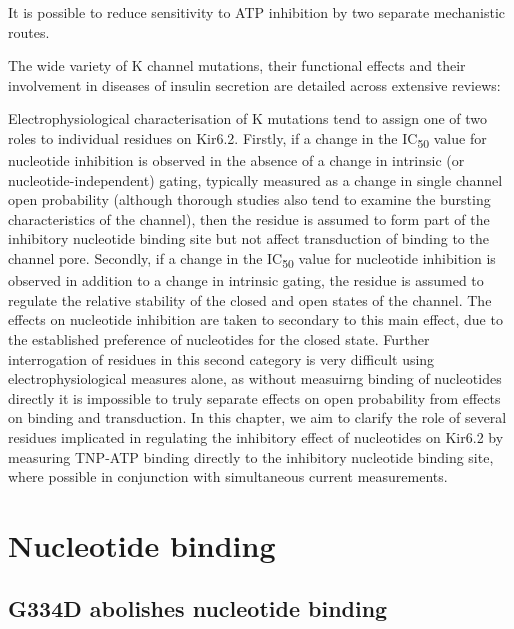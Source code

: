 It is possible to reduce sensitivity to ATP inhibition by two separate mechanistic routes.

The wide variety of K\ATP{} channel mutations, their functional effects and their involvement in diseases of insulin secretion are detailed across extensive reviews: \cite{hattersley_activating_2005, nichols_k_2006, aguilar-bryan_neonatal_2008, flanagan_update_2009, ashcroft_diabetes_2012, ashcroft_katp_2013, ashcroft_neonatal_2017, rorsman_pancreatic_2017, pipatpolkai_new_2020}


Electrophysiological characterisation of K\ATP{} mutations tend to assign one of two roles to individual residues on Kir6.2.
Firstly, if a change in the IC\textsubscript{50} value for nucleotide inhibition is observed in the absence of a change in intrinsic (or nucleotide-independent) gating, typically measured as a change in single channel open probability (although thorough studies also tend to examine the bursting characteristics of the channel), then the residue is assumed to form part of the inhibitory nucleotide binding site but not affect transduction of binding to the channel pore.
Secondly, if a change in the IC\textsubscript{50} value for nucleotide inhibition is observed in addition to a change in intrinsic gating, the residue is assumed to regulate the relative stability of the closed and open states of the channel.
The effects on nucleotide inhibition are taken to secondary to this main effect, due to the established preference of nucleotides for the closed state.
Further interrogation of residues in this second category is very difficult using electrophysiological measures alone, as without measuirng binding of nucleotides directly it is impossible to truly separate effects on open probability from effects on binding and transduction.
In this chapter, we aim to clarify the role of several residues implicated in regulating the inhibitory effect of nucleotides on Kir6.2 by measuring TNP-ATP
binding directly to the inhibitory nucleotide binding site, where possible in conjunction with simultaneous current measurements.

\section{Nucleotide binding}

\subsection{G334D abolishes nucleotide binding}

